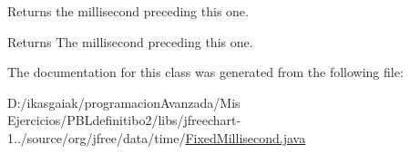 Returns the millisecond preceding this one.

\begin{DoxyReturn}{Returns}
The millisecond preceding this one. 
\end{DoxyReturn}


The documentation for this class was generated from the following file\+:\begin{DoxyCompactItemize}
\item 
D\+:/ikasgaiak/programacion\+Avanzada/\+Mis Ejercicios/\+P\+B\+Ldefinitibo2/libs/jfreechart-\/1../source/org/jfree/data/time/\mbox{\hyperlink{_fixed_millisecond_8java}{Fixed\+Millisecond.\+java}}\end{DoxyCompactItemize}
